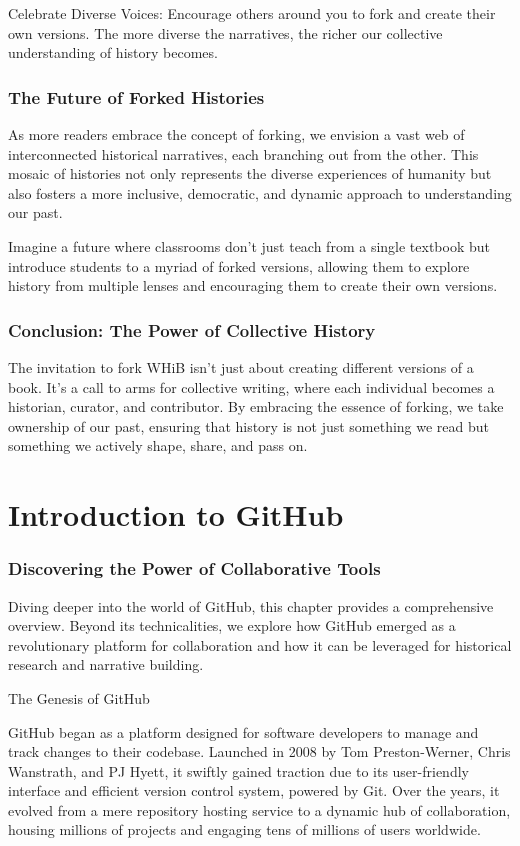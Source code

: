 \documentclass[a4paper,12pt]{book}
\begin{document}
Celebrate Diverse Voices: Encourage others around you to fork and create their own versions. The more diverse the narratives, the richer our collective understanding of history becomes.

\subsection*{The Future of Forked Histories}

As more readers embrace the concept of forking, we envision a vast web of interconnected historical narratives, each branching out from the other. This mosaic of histories not only represents the diverse experiences of humanity but also fosters a more inclusive, democratic, and dynamic approach to understanding our past.

Imagine a future where classrooms don't just teach from a single textbook but introduce students to a myriad of forked versions, allowing them to explore history from multiple lenses and encouraging them to create their own versions.

\subsection*{Conclusion: The Power of Collective History}

The invitation to fork WHiB isn't just about creating different versions of a book. It's a call to arms for collective writing, where each individual becomes a historian, curator, and contributor. By embracing the essence of forking, we take ownership of our past, ensuring that history is not just something we read but something we actively shape, share, and pass on.

\chapter{Introduction to GitHub}
\subsection*{Discovering the Power of Collaborative Tools}
Diving deeper into the world of GitHub, this chapter provides a comprehensive overview. Beyond its technicalities, we explore how GitHub emerged as a revolutionary platform for collaboration and how it can be leveraged for historical research and narrative building.

The Genesis of GitHub

GitHub began as a platform designed for software developers to manage and track changes to their codebase. Launched in 2008 by Tom Preston-Werner, Chris Wanstrath, and PJ Hyett, it swiftly gained traction due to its user-friendly interface and efficient version control system, powered by Git. Over the years, it evolved from a mere repository hosting service to a dynamic hub of collaboration, housing millions of projects and engaging tens of millions of users worldwide.
\end{document}
